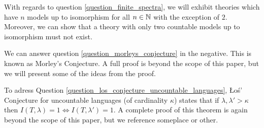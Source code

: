 With regards to question \ref{question_finite_spectra}, we will exhibit theories which have \(n\) models up to isomorphism for all \(n \in \mathbb{N}\) with the exception of \(2\).
Moreover, we can show that a theory with only two countable models up to isomorphism must not exist. 


We can answer question \ref{question_morleys_conjecture} in the negative. This is known as Morley's Conjecture. A full proof is beyond the scope of this paper, but we will present some of the ideas from the proof. 

To adress Question \ref{question_los_conjecture_uncountable_languages}, \L o\'s' Conjecture for uncountable languages (of cardinality \(\kappa\)) states that if \(\lambda, \lambda' >\kappa\) then \(I(T, \lambda) = 1 \iff I(T, \lambda') = 1\). 
A complete proof of this theorem is again beyond the scope of this paper, but we reference {\color{red}someplace or other.} %
